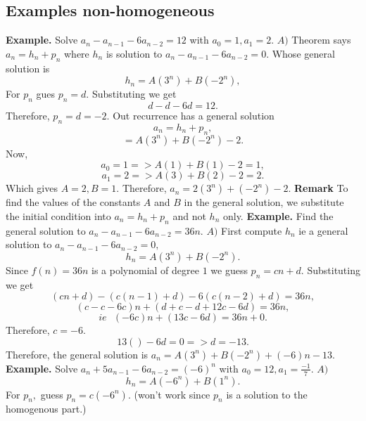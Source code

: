 \documentclass{article}
\begin{document}
\subsection{Examples non-homogeneous}
\textbf{Example. } Solve $a_n - a_{n - 1} - 6a_{n - 2} = 12$ with $a_0 = 1, a_1 = 2.$
\newline
\newline
$A) $ Theorem says $a_n = h_n + p_n$ where $h_n$ is solution to $a_n - a_{n - 1} - 6a_{n - 2} = 0.$
\newline
\newline
Whose general solution is
$$h_n = A(3^n) + B(-2^n),$$
For $p_n$ gues $p_n = d.$
\newline
Substituting we get 
$$d - d - 6d = 12.$$
Therefore, $p_n = d = -2.$
\newline
Out recurrence has a general solution
$$a_n = h_n + p_n,$$
$$ = A(3^n) + B(-2^n) - 2.$$
Now, 
$$a_0 = 1 => A(1) + B(1) - 2 = 1,$$
$$a_1 = 2 => A(3) + B(2) - 2 = 2.$$
Which gives $A = 2, B = 1.$
\newline
\newline
Therefore, $a_n = 2(3^n) + (-2^n) - 2.$
\newline
\newline
\textbf{Remark } To find the values of the constants $A$ and $B$ in the 
general solution, we substitute the initial condition into $a_n = h_n + p_n$ and 
not $h_n$ only. 
\newline
\newline
\textbf{Example. } Find the general solution to $a_n - a_{n - 1} - 6a_{n - 2} = 36n.$
\newline
\newline
$A) $ First compute $h_n$ ie a general solution to $a_n - a_{n - 1} - 6a_{n - 2} = 0,$
$$h_n = A(3^n) + B(-2^n).$$
Since $f(n) = 36n$ is a polynomial of degree $1$ we guess $p_n = cn + d.$
\newline
Substituting we get
$$(cn + d) - (c(n - 1) + d) - 6(c(n - 2) + d) = 36n,$$
$$(c - c - 6c)n + (d + c - d + 12c - 6d) = 36n,$$
$$ie \text{ } (-6c)n + (13c - 6d) = 36n + 0.$$
Therefore, $c = -6.$
$$13() - 6d = 0 => d = -13.$$
Therefore, the general solution is $a_n = A(3^n) + B(-2^n) + (-6)n - 13.$
\newline
\newline
\textbf{Example. } Solve $a_n + 5a_{n - 1} - 6a_{n - 2} = (-6)^n$ with $a_0 = 12, a_1 = \frac{-1}{7}.$
\newline
\newline
$A) $ 
$$h_n = A(-6^n) + B(1^n).$$
For $p_n,$ guess $p_n = c(-6^n).$ (won't work since $p_n$ is a solution to the homogenous part.)
\end{document}
